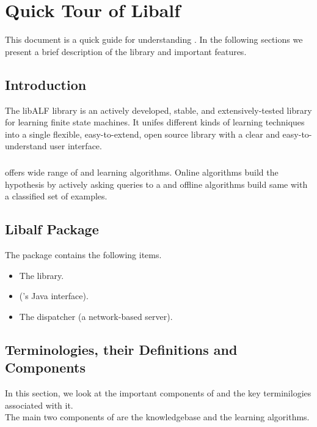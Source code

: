 \chapter{Quick Tour of Libalf}
This document is a quick guide for understanding \libalf. In the following sections we present a brief description of the library and important features. 

\section{Introduction}
The libALF library is an actively developed, stable, and extensively-tested library for learning finite state machines. It unifes different kinds of learning techniques into a single flexible, easy-to-extend, open source library with a clear and easy-to-understand
user interface. 
\paragraph{}
\libalf offers wide range of \offline and \online learning algorithms. Online algorithms build the hypothesis by actively asking queries to a \teacher and offline algorithms build same with a classified set of examples. 

\section{Libalf Package}
The \libalf package contains the following items.
\begin{itemize}
  \item The \libalf \cpp library.
  \item \jalf (\libalf's Java interface).
  \item The dispatcher (a network-based \libalf server).
\end{itemize}

\section{Terminologies, their Definitions and \libalf Components}
In this section, we look at the important components of \libalf and the key terminilogies associated with it. \\
The main two components of \libalf are the knowledgebase and the learning algorithms.
